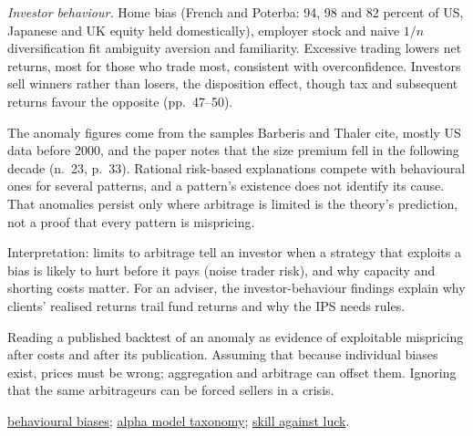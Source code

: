 \begin{qfmechanism}
\emph{Investor behaviour.} Home bias (French and Poterba: 94, 98 and 82 percent of US, Japanese and UK equity held domestically), employer stock and naive $1/n$ diversification fit ambiguity aversion and familiarity. Excessive trading lowers net returns, most for those who trade most, consistent with overconfidence. Investors sell winners rather than losers, the disposition effect, though tax and subsequent returns favour the opposite (pp.~47--50).

 The anomaly figures come from the samples Barberis and Thaler cite, mostly US data before 2000, and the paper notes that the size premium fell in the following decade (n.~23, p.~33). Rational risk-based explanations compete with behavioural ones for several patterns, and a pattern's existence does not identify its cause. That anomalies persist only where arbitrage is limited is the theory's prediction, not a proof that every pattern is mispricing.

 Interpretation: limits to arbitrage tell an investor when a strategy that exploits a bias is likely to hurt before it pays (noise trader risk), and why capacity and shorting costs matter. For an adviser, the investor-behaviour findings explain why clients' realised returns trail fund returns and why the IPS needs rules.

 Reading a published backtest of an anomaly as evidence of exploitable mispricing after costs and after its publication. Assuming that because individual biases exist, prices must be wrong; aggregation and arbitrage can offset them. Ignoring that the same arbitrageurs can be forced sellers in a crisis.

 \hyperref[def:behavioural-biases]{behavioural biases}; \hyperref[def:alpha-model-taxonomy]{alpha model taxonomy}; \hyperref[meth:skill-luck-significance-tests]{skill against luck}.

\end{qfmechanism}
